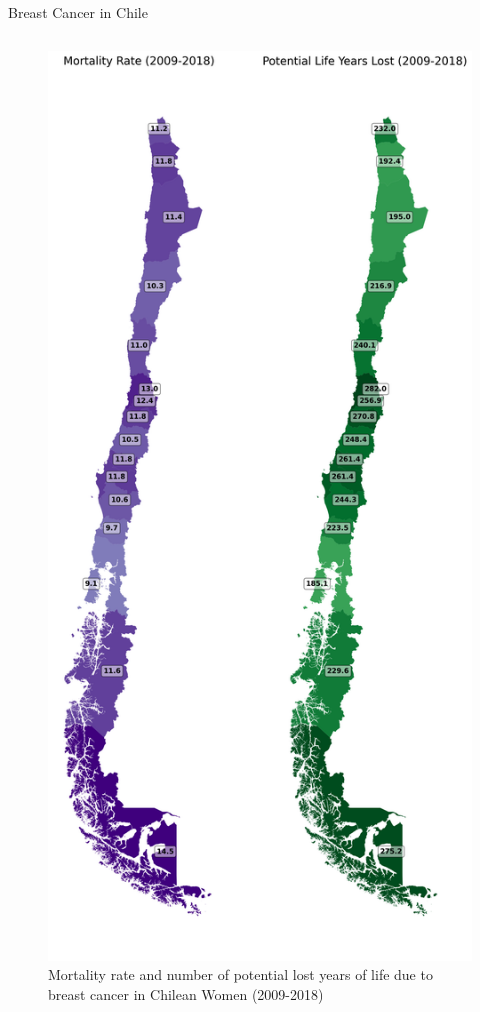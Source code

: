 \begin{frame}{Breast Cancer in Chile}
\begin{columns}
\begin{column}{0.4\textwidth}
\begin{figure}
                \includegraphics[height=0.5\textheight]{imagenes/mortalidad.png}
                \caption{Mortality rate and number of potential lost years of life due to breast cancer in Chilean Women (2009-2018)}
            \end{figure}
        \end{column}
    \end{columns}
        
\end{frame}


